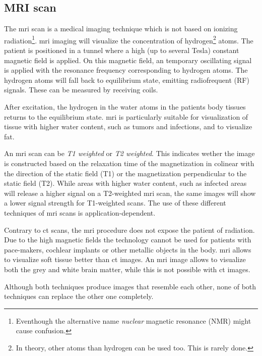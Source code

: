 \subsection{MRI scan}
The \acrfull{mri} scan is a medical imaging technique which is not based on ionizing radiation\footnote{Eventhough the alternative name \textit{nuclear} magnetic resonance (NMR) might cause confusion.}.
\acrshort{mri} imaging will visualize the concentration of hydrogen\footnote{In theory, other atoms than hydrogen can be used too. This is rarely done.} atoms.
The patient is positioned in a tunnel where a high (up to several Tesla) constant magnetic field is applied. On this magnetic field, an temporary oscillating signal is applied with the resonance frequency corresponding to hydrogen atoms.
The hydrogen atoms will fall back to equilibrium state, emitting radiofrequent (RF) signals. These can be measured by receiving coils.

After excitation, the hydrogen in the water atoms in the patients body tissues returns to the equilibrium state. \acrlong{mri} is particularly suitable for visualization of tissue with higher water content, such as tumors and infections, and to visualize fat.

An \acrshort{mri} scan can be \textit{T1 weighted} or \textit{T2 weighted}. 
This indicates wether the image is constructed based on the relaxation time of the magnetization in colinear with the direction of the static field (T1) or the magnetization perpendicular to the static field (T2).
While areas with higher water content, such as infected areas will release a higher signal on a T2-weighted \acrshort{mri} scan, the same images will show a lower signal strength for T1-weighted scans.
The use of these different techniques of \acrshort{mri} scans is application-dependent.

Contrary to \acrfull{ct} scans, the \acrlong{mri} procedure does not expose the patient of radiation. Due to the high magnetic fields the technology cannot be used for patients with pace-makers, cochlear implants or other metallic objects in the body.
\acrshort{mri} allows to visualize soft tissue better than \acrshort{ct} images. An \acrshort{mri} image allows to visualize both the grey and white brain matter, while this is not possible with \acrshort{ct} images.


Although both techniques produce images that resemble each other, none of both techniques can replace the other one completely.